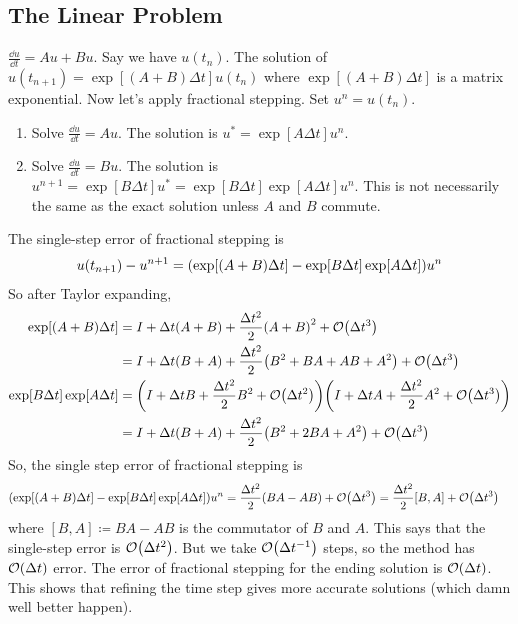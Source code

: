 \documentclass{article}
\newcommand{\Dt}{\Delta t}
\begin{document}
        \subsection{The Linear Problem}
            $\frac{\dd u}{\dd t} = Au + Bu$.  Say we have $u(t_n)$.  The solution of $u(t_{n+1}) = \exp[(A+B)\Dt]u(t_n)$ where $\exp[(A+B)\Dt]$ is a matrix exponential.  Now let's apply fractional stepping.  Set $u^n = u(t_n)$.
            \begin{enumerate}
                \item Solve $\frac{\dd u}{\dd t} = Au$.  The solution is $u^* = \exp[A\Dt]u^n$.
                \item Solve $\frac{\dd u}{\dd t} = Bu$.  The solution is $u^{n+1} = \exp[B\Dt]u^* = \exp[B\Dt]\exp[A\Dt]u^n$.  This is not necessarily the same as the exact solution unless $A$ and $B$ commute.
            \end{enumerate}
            The single-step error of fractional stepping is
            \begin{align*}
                u(t_{n+1}) - u^{n+1} = \qty(\exp[(A+B)\Dt] - \exp[B\Dt]\exp[A\Dt])u^n
            \end{align*}
            So after Taylor expanding,
            \begin{align*}
                \exp[(A+B)\Dt] &= I + \Dt(A+B) + \frac{\Dt^2}{2}\qty(A + B)^2 + \order{\Dt^3} \\
                &= I + \Dt(B + A) + \frac{\Dt^2}{2}\qty(B^2 + BA + AB + A^2) + \order{\Dt^3} \\
                \exp[B\Dt]\exp[A\Dt] &= \qty(I + \Dt B + \frac{\Dt^2}2 B^2 + \order{\Dt^2})\qty(I + \Dt A + \frac{\Dt^2}{2}A^2 + \order{\Dt^3}) \\
                &= I + \Dt(B + A) + \frac{\Dt^2}{2}\qty(B^2 + 2BA + A^2) + \order{\Dt^3}
            \end{align*}
            So, the single step error of fractional stepping is
            \begin{align*}
                \qty(\exp[(A+B)\Dt] - \exp[B\Dt]\exp[A\Dt])u^n &= \frac{\Dt^2}{2}\qty(BA - AB) +\order{\Dt^3} = \frac{\Dt^2}{2}[B,A] + \order{\Dt^3}
            \end{align*}
            where $[B,A] \coloneqq BA - AB$ is the commutator of $B$ and $A$.  This says that the single-step error is $\order{\Dt^2}$.  But we take $\order{\Dt^{-1}}$ steps, so the method has $\order{\Dt}$ error.  The error of fractional stepping for the ending solution is $\order{\Dt}$.  This shows that refining the time step gives more accurate solutions (which damn well better happen).
\end{document}
